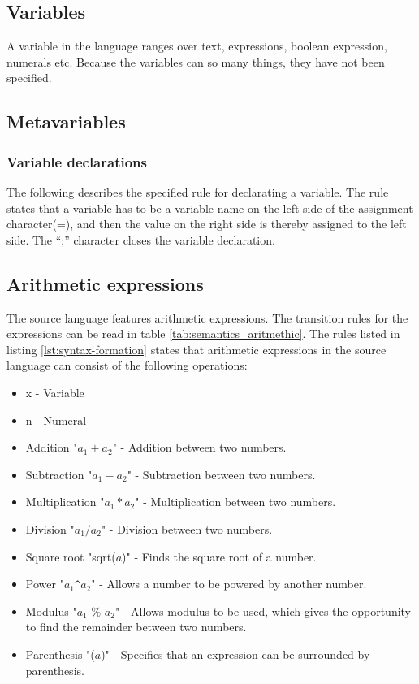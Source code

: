 \subsection{Variables}
A variable in the language ranges over text, expressions, boolean expression, numerals etc. Because the variables can so many things, they have not been specified. 

\subsection{Metavariables}

\subsubsection{Variable declarations}\label{sec:analysis:syntax-definition:variable-declaration}
The following describes the specified rule for declarating a variable. The rule states that a variable has to be a variable name on the left side of the assignment character(=), and then the value on the right side is thereby assigned to the left side. The ``;'' character closes the variable declaration.

\subsection{Arithmetic expressions}
The source language features arithmetic expressions. The transition rules for the expressions can be read in table \ref{tab:semantics_aritmethic}.
The rules listed in listing \ref{lst:syntax-formation} states that arithmetic expressions in the source language can consist of the following operations:
\begin{itemize}
	\item x - Variable
	\item n - Numeral
	\item Addition "$a_1 + a_2$" - Addition between two numbers.
	\item Subtraction "$a_1 - a_2$" - Subtraction between two numbers.
	\item Multiplication "$a_1 * a_2$" - Multiplication between two numbers.
	\item Division "$a_1 / a_2$" - Division between two numbers.
	\item Square root "sqrt($a$)" - Finds the square root of a number.
	\item Power "$a_1$\texttt{\^{}}$a_2$" - Allows a number to be powered by another number.
	\item Modulus "$a_1$ \% $a_2$" - Allows modulus to be used, which gives the opportunity to find the remainder between two numbers.
	\item Parenthesis "($a$)" - Specifies that an expression can be surrounded by parenthesis.
\end{itemize}

